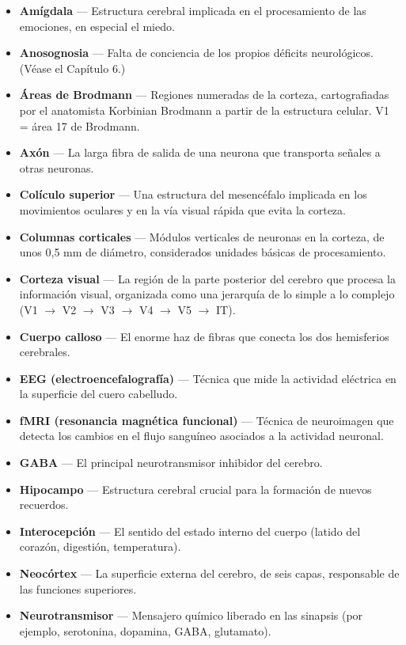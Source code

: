 \documentclass[11pt, twoside, openright]{book}
\begin{document}
\begin{itemize}
  \item \textbf{Amígdala} --- Estructura cerebral implicada en el procesamiento de las emociones, en especial el miedo.
  \item \textbf{Anosognosia} --- Falta de conciencia de los propios déficits neurológicos. (Véase el Capítulo 6.)
  \item \textbf{Áreas de Brodmann} --- Regiones numeradas de la corteza, cartografiadas por el anatomista Korbinian Brodmann a partir de la estructura celular. V1 = área 17 de Brodmann.
  \item \textbf{Axón} --- La larga fibra de salida de una neurona que transporta señales a otras neuronas.
  \item \textbf{Colículo superior} --- Una estructura del mesencéfalo implicada en los movimientos oculares y en la vía visual rápida que evita la corteza.
  \item \textbf{Columnas corticales} --- Módulos verticales de neuronas en la corteza, de unos 0,5 mm de diámetro, considerados unidades básicas de procesamiento.
  \item \textbf{Corteza visual} --- La región de la parte posterior del cerebro que procesa la información visual, organizada como una jerarquía de lo simple a lo complejo (V1 $\rightarrow$ V2 $\rightarrow$ V3 $\rightarrow$ V4 $\rightarrow$ V5 $\rightarrow$ IT).
  \item \textbf{Cuerpo calloso} --- El enorme haz de fibras que conecta los dos hemisferios cerebrales.
  \item \textbf{EEG (electroencefalografía)} --- Técnica que mide la actividad eléctrica en la superficie del cuero cabelludo.
  \item \textbf{fMRI (resonancia magnética funcional)} --- Técnica de neuroimagen que detecta los cambios en el flujo sanguíneo asociados a la actividad neuronal.
  \item \textbf{GABA} --- El principal neurotransmisor inhibidor del cerebro.
  \item \textbf{Hipocampo} --- Estructura cerebral crucial para la formación de nuevos recuerdos.
  \item \textbf{Interocepción} --- El sentido del estado interno del cuerpo (latido del corazón, digestión, temperatura).
  \item \textbf{Neocórtex} --- La superficie externa del cerebro, de seis capas, responsable de las funciones superiores.
  \item \textbf{Neurotransmisor} --- Mensajero químico liberado en las sinapsis (por ejemplo, serotonina, dopamina, GABA, glutamato).

\end{itemize}
\end{document}
